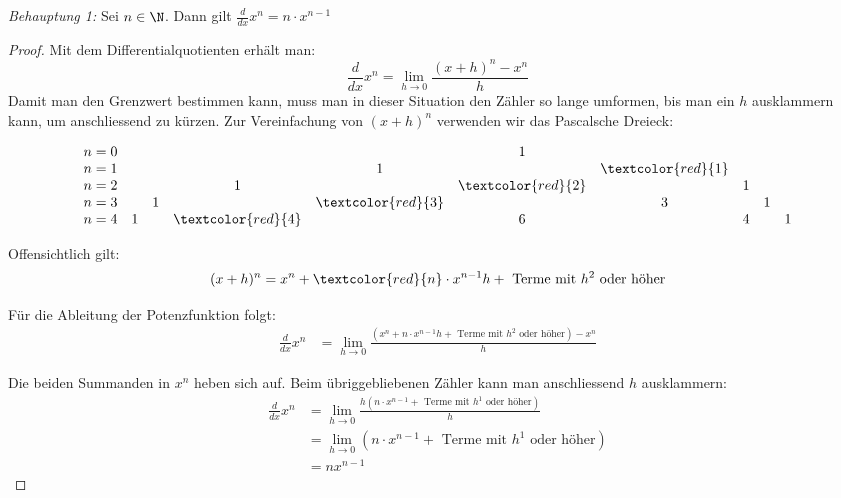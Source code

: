 \emph{Behauptung 1:} Sei $n\in \N$. Dann gilt
$\frac{d}{dx} x^n = n\cdot x^{n-1}$
\begin{proof}
    Mit dem Differentialquotienten erhält man:
    $$\frac{d}{dx} x^n=\lim_{h\rightarrow0}\frac{(x+h)^n-x^n}{h}$$
    Damit man den Grenzwert bestimmen kann, muss man in dieser Situation den Zähler so lange umformen, bis man ein $h$ ausklammern kann, um anschliessend zu kürzen. Zur Vereinfachung von $(x+h)^n$ verwenden wir das Pascalsche Dreieck:

    \[
        \begin{array}{lccccccccc}
            n=0 &   &   &                    &                    & 1                  &                    &   &   &   \\
            n=1 &   &   &                    & 1                  &                    & \textcolor{red}{1} &   &   &   \\
            n=2 &   &   & 1                  &                    & \textcolor{red}{2} &                    & 1 &   &   \\
            n=3 &   & 1 &                    & \textcolor{red}{3} &                    & 3                  &   & 1 &   \\
            n=4 & 1 &   & \textcolor{red}{4} &                    & 6                  &                    & 4 &   & 1
        \end{array}
    \]

    Offensichtlich gilt:
    $$(x+h)^n = x^n + \textcolor{red}{n}\cdot x^{n-1}h + \text { Terme mit } h^2 \text{ oder höher}$$



    Für die Ableitung der Potenzfunktion folgt:
    \begin{align*}
        \frac{d}{dx} x^n & = \lim_{h\rightarrow 0}\frac{\left( x^n + n\cdot x^{n-1}h + \text { Terme mit } h^2 \text{ oder höher} \right)- x^n}{h}
    \end{align*}

    Die beiden Summanden in $x^n$ heben sich auf. Beim übriggebliebenen Zähler kann man anschliessend $h$ ausklammern:
    \begin{align*}
        \frac{d}{dx} x^n & = \lim_{h\rightarrow 0} \frac{h \left(n\cdot x^{n-1} + \text { Terme mit } h^1 \text{ oder höher} \right)}{h} \\
                         & = \lim_{h\rightarrow 0} \left(n\cdot x^{n-1} + \text { Terme mit } h^1 \text{ oder höher}  \right)            \\
                         & = n x^{n-1}
    \end{align*}







\end{proof}
